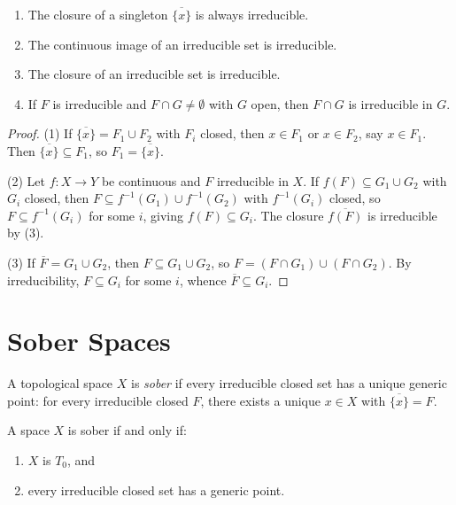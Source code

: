\begin{proposition}
\begin{enumerate}
  \item The closure of a singleton $\overline{\{x\}}$ is always irreducible.
  \item The continuous image of an irreducible set is irreducible.
  \item The closure of an irreducible set is irreducible.
  \item If $F$ is irreducible and $F \cap G \neq \emptyset$ with $G$ open, then $F \cap G$
    is irreducible in $G$.
\end{enumerate}
\end{proposition}

\begin{proof}
(1) If $\overline{\{x\}} = F_1 \cup F_2$ with $F_i$ closed, then $x \in F_1$ or
$x \in F_2$, say $x \in F_1$. Then $\overline{\{x\}} \subseteq F_1$, so
$F_1 = \overline{\{x\}}$.

(2) Let $f\colon X \to Y$ be continuous and $F$ irreducible in $X$. If
$f(F) \subseteq G_1 \cup G_2$ with $G_i$ closed, then $F \subseteq f^{-1}(G_1) \cup
f^{-1}(G_2)$ with $f^{-1}(G_i)$ closed, so $F \subseteq f^{-1}(G_i)$ for some $i$,
giving $f(F) \subseteq G_i$. The closure $\overline{f(F)}$ is irreducible by (3).

(3) If $\overline{F} = G_1 \cup G_2$, then $F \subseteq G_1 \cup G_2$, so
$F = (F \cap G_1) \cup (F \cap G_2)$. By irreducibility, $F \subseteq G_i$ for some $i$,
whence $\overline{F} \subseteq G_i$.
\end{proof}

\section{Sober Spaces}

\begin{definition}
A topological space $X$ is \emph{sober} if every irreducible closed set has a unique
generic point: for every irreducible closed $F$, there exists a unique $x \in X$ with
$\overline{\{x\}} = F$.
\end{definition}

\begin{theorem}
A space $X$ is sober if and only if:
\begin{enumerate}
  \item $X$ is $T_0$, and
  \item every irreducible closed set has a generic point.
\end{enumerate}
\end{theorem}

